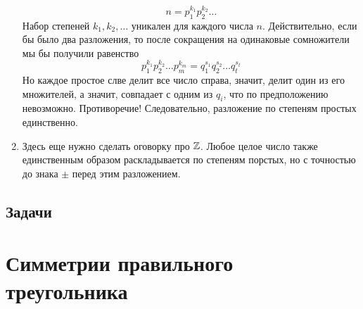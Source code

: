 \begin{enumerate}
$$
n=p_1^{k_1}p_2^{k_2}\dots
$$
Набор степеней $k_1,k_2,\dots$ уникален для каждого числа $n$. Действительно, если бы было два разложения, то после сокращения на одинаковые сомножители мы бы получили равенство
$$
p_1^{k_1}p_2^{k_2}\dots p_m^{k_m} = q_1^{s_1}q_2^{s_2}\dots q_t^{s_t}
$$
Но каждое простое слве делит все число справа, значит, делит один из его множителей, а значит, совпадает с одним из $q_i$, что по предположению невозможно. Противоречие! Следовательно, разложение по степеням простых единственно.
\item Здесь еще нужно сделать оговорку про $\mathbb Z$. Любое целое число также единственным образом раскладывается по степеням порстых, но с точностью до знака $\pm$ перед этим разложением.
\end{enumerate}
\subsection{Задачи}






\section{Симметрии правильного треугольника}

